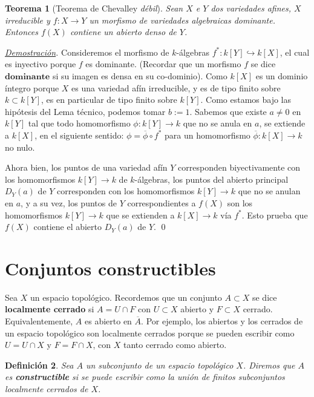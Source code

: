 \documentclass[12pt]{article}
\theoremstyle{customTheorem}
\newtheorem{theorem}{Teorema}[section]
\theoremstyle{customDefinition}
\newtheorem{definition}[theorem]{Definición}
\renewenvironment{proof}[1][Demostración]{\noindent \textit{\underline{#1}.\hspace{2mm}}}{\hfill\qed}
\newenvironment{Theorem}{\begin{tcolorbox}[colback=OliveGreen!18] \begin{theorem}}{ \end{theorem} \end{tcolorbox}}
\renewcommand{\bar}[1]{\overline{#1}}
\begin{document}
\begin{Theorem}[Teorema de Chevalley \textit{débil}]\label{Teorema debil}
    Sean $X$ e $Y$ dos variedades afines, $X$ irreducible y $f : X \to Y$ un morfismo de variedades algebraicas dominante. Entonces $f(X)$ contiene un abierto denso de $Y$.
\end{Theorem}
\begin{proof}
    Consideremos el morfismo de $k$-álgebras $f^* : k[Y] \hookrightarrow k[X]$, el cual es inyectivo porque $f$ es dominante. (Recordar que un morfismo $f$ se dice $\textbf{dominante}$ si su imagen es densa en su co-dominio). Como $k[X]$ es un dominio íntegro porque $X$ es una variedad afín irreducible, y es de tipo finito sobre $k \subset k[Y]$, es en particular de tipo finito sobre $k[Y]$. Como estamos bajo las hipótesis del Lema técnico, podemos tomar $b := 1$. Sabemos que existe $a \neq 0$ en $k[Y]$ tal que todo homomorfismo $\phi : k[Y] \to k$ que no se anula en $a$, se extiende a $k[X]$, en el siguiente sentido: $\phi = \bar \phi  \circ f^*$ para un homomorfismo $\bar \phi : k[X] \to k$ no nulo.

    Ahora bien, los puntos de una variedad afín $Y$ corresponden biyectivamente con los homomorfismos $k[Y] \to k$ de $k$-álgebras, los puntos del abierto principal $D_Y (a)$ de $Y$ corresponden con los homomorfismos $k[Y] \to k$ que no se anulan en $a$, y a su vez, los puntos de $Y$ correspondientes a $f(X)$ son los homomorfismos $k[Y] \to k$ que se extienden a $k[X] \to k$ vía $f^*$. Esto prueba que $f(X)$ contiene el abierto $D_Y (a)$ de $Y$.
\end{proof}



\section{Conjuntos constructibles}

Sea $X$ un espacio topológico. Recordemos que un conjunto $A \subset X$ se dice \textbf{localmente cerrado} si $A = U \cap F$ con $U \subset X$ abierto y $F \subset X$ cerrado. Equivalentemente, $A$ es abierto en $\bar A$. Por ejemplo, los abiertos y los cerrados de un espacio topológico son localmente cerrados porque se pueden escribir como $U = U \cap X$ y $F = F \cap X$, con $X$ tanto cerrado como abierto.

\begin{definition}
    Sea $A$ un subconjunto de un espacio topológico $X$. Diremos que $A$ es \textbf{constructible} si se puede escribir como la unión de finitos subconjuntos localmente cerrados de $X$.
\end{definition}
\end{document}
